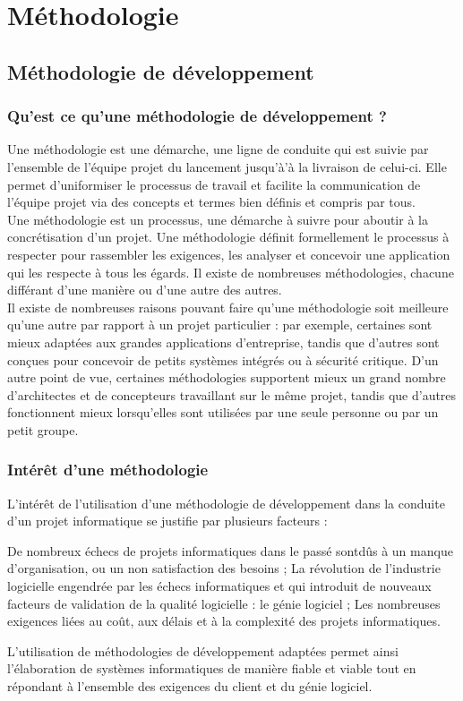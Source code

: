 \chapter{Méthodologie}
\minitoc
\clearpage
\section{Méthodologie de développement}
\subsection{Qu'est ce qu'une méthodologie de développement ?}
Une méthodologie est une démarche, une ligne de conduite qui est suivie par l’ensemble de l’équipe projet du lancement jusqu'à’à la livraison de celui-ci. Elle permet d’uniformiser le processus de travail et facilite la communication de l’équipe projet via des concepts et termes bien définis et compris par tous.\\
Une méthodologie est un processus, une démarche à suivre pour aboutir à la concrétisation d'un projet. Une méthodologie définit formellement le processus à respecter pour rassembler les exigences, les analyser et concevoir une application qui les respecte à tous les égards. Il existe de nombreuses méthodologies, chacune différant d'une manière ou d'une autre des autres. \\
Il existe de nombreuses raisons pouvant faire qu'une méthodologie soit meilleure qu'une autre par rapport à un projet particulier : par exemple, certaines sont mieux adaptées aux grandes applications d'entreprise, tandis que d'autres sont conçues pour concevoir de petits systèmes intégrés ou à sécurité critique. D'un autre point de vue, certaines méthodologies supportent mieux un grand nombre d'architectes et de concepteurs travaillant sur le même projet, tandis que d'autres fonctionnent mieux lorsqu'elles sont utilisées par une seule personne ou par un petit groupe.
\subsection{Intérêt d'une méthodologie}   
L'intérêt de l'utilisation d'une méthodologie de développement dans la conduite d'un projet informatique se justifie par plusieurs facteurs :
\begin{itemize}
	\itemtirait De nombreux échecs de projets informatiques dans le passé sontdûs à un manque d'organisation, ou un non satisfaction des besoins ;
	\itemtirait La révolution de l'industrie logicielle engendrée par les échecs informatiques et qui introduit de nouveaux facteurs de validation de la qualité logicielle : le génie logiciel ;
	\itemtirait Les nombreuses exigences liées au coût, aux délais et à la complexité des projets informatiques.
\end{itemize}
L'utilisation de méthodologies de développement adaptées permet ainsi l'élaboration de systèmes informatiques de manière fiable et viable tout en répondant à l'ensemble des exigences du client et du génie logiciel.                          
